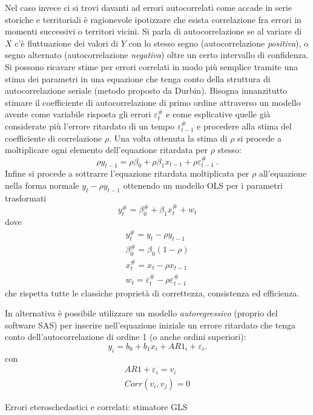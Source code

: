 \documentclass[a4page, 11pt]{article} %
\begin{document}
Nel caso invece ci si trovi davanti ad errori autocorrelati come accade in serie storiche e territoriali è ragionevole ipotizzare che esista correlazione fra errori in momenti successivi o territori vicini. Si parla di autocorrelazione se al variare di $X$ c'è fluttuazione dei valori di $Y$ con lo stesso segno (autocorrelazione \textit{positiva}), o segno alternato (autocorrelazione \textit{negativa}) oltre un certo intervallo di confidenza. Si possono ricavare stime per errori correlati in modo più semplice tramite una stima dei parametri in una equazione che tenga conto della struttura di autocorrelazione seriale (metodo proposto da Durbin). 
Bisogna innanzitutto stimare il coefficiente di autocorrelazione di primo ordine attraverso un modello avente come variabile risposta gli errori $\varepsilon_t^\#$ e come esplicative quelle già considerate più l’errore ritardato di un tempo $\varepsilon_{t-1}^\#$ e procedere alla stima del coefficiente di correlazione $\rho$. Una volta ottenuta la stima di $\rho$ si procede a moltiplicare ogni elemento dell'equazione ritardata per $\rho$ stesso: 
\begin{equation*}
\rho y_{t-1} = \rho\beta_0 + \rho\beta_1 x_{t-1} +\rho\varepsilon_{t-1}^\# \ .
\end{equation*}
Infine si procede a sottrarre l'equazione ritardata moltiplicata per $\rho$ all'equazione nella forma normale $y_t - \rho y_{t-1}$ ottenendo un modello OLS per i parametri trasformati 
\begin{equation*}
y_t^\# = \beta_0^\# + \beta_1 x_t^\# + w_t
\end{equation*} 
dove
\begin{equation*}
\begin{matrix}
y_t^\# = y_t - \rho y_{t-1}\\
\beta_0^\# = \beta_0(1 -\rho)\\
x_t^\# = x_t - \rho x_{t-1}\\
w_t =\varepsilon_t^\# - \rho \varepsilon_{t-1}^\# 
\end{matrix}
\end{equation*}
che rispetta tutte le classiche proprietà di correttezza, consistenza ed efficienza. 

In alternativa è possibile utilizzare un modello \textit{autoregressivo} (proprio del software SAS) per inserire nell’equazione iniziale un errore ritardato che tenga conto dell’autocorrelazione di ordine 1 (o anche ordini superiori): 
\begin{equation*}
y_i=b_0 +b_1 x_i +AR1_i  + \varepsilon_i. 
\end{equation*}
con 
\begin{align*}
AR1 + \varepsilon_i = v_i \\
Corr(v_i,v_j) = 0
\end{align*}
\begin{itshape}
Errori eteroschedastici e correlati: stimatore GLS
\end{itshape}
\end{document}
